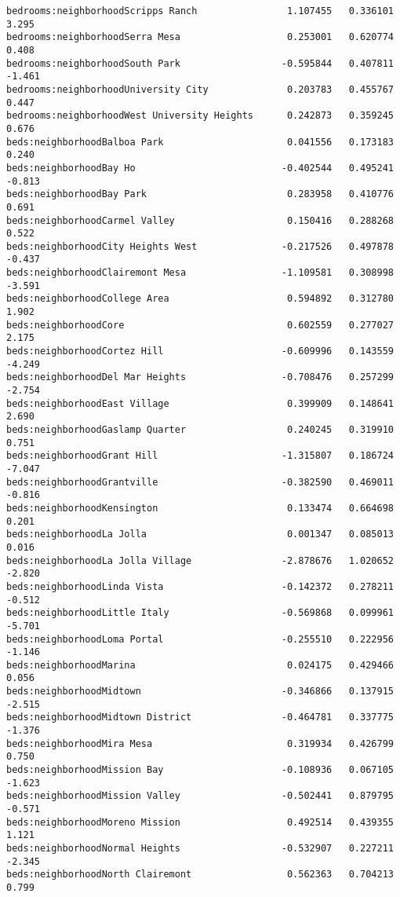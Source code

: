 \documentclass[
  letterpaper,
  krantz2]{style/krantz}
\begin{document}
\begin{verbatim}
bedrooms:neighborhoodScripps Ranch                1.107455   0.336101   3.295
bedrooms:neighborhoodSerra Mesa                   0.253001   0.620774   0.408
bedrooms:neighborhoodSouth Park                  -0.595844   0.407811  -1.461
bedrooms:neighborhoodUniversity City              0.203783   0.455767   0.447
bedrooms:neighborhoodWest University Heights      0.242873   0.359245   0.676
beds:neighborhoodBalboa Park                      0.041556   0.173183   0.240
beds:neighborhoodBay Ho                          -0.402544   0.495241  -0.813
beds:neighborhoodBay Park                         0.283958   0.410776   0.691
beds:neighborhoodCarmel Valley                    0.150416   0.288268   0.522
beds:neighborhoodCity Heights West               -0.217526   0.497878  -0.437
beds:neighborhoodClairemont Mesa                 -1.109581   0.308998  -3.591
beds:neighborhoodCollege Area                     0.594892   0.312780   1.902
beds:neighborhoodCore                             0.602559   0.277027   2.175
beds:neighborhoodCortez Hill                     -0.609996   0.143559  -4.249
beds:neighborhoodDel Mar Heights                 -0.708476   0.257299  -2.754
beds:neighborhoodEast Village                     0.399909   0.148641   2.690
beds:neighborhoodGaslamp Quarter                  0.240245   0.319910   0.751
beds:neighborhoodGrant Hill                      -1.315807   0.186724  -7.047
beds:neighborhoodGrantville                      -0.382590   0.469011  -0.816
beds:neighborhoodKensington                       0.133474   0.664698   0.201
beds:neighborhoodLa Jolla                         0.001347   0.085013   0.016
beds:neighborhoodLa Jolla Village                -2.878676   1.020652  -2.820
beds:neighborhoodLinda Vista                     -0.142372   0.278211  -0.512
beds:neighborhoodLittle Italy                    -0.569868   0.099961  -5.701
beds:neighborhoodLoma Portal                     -0.255510   0.222956  -1.146
beds:neighborhoodMarina                           0.024175   0.429466   0.056
beds:neighborhoodMidtown                         -0.346866   0.137915  -2.515
beds:neighborhoodMidtown District                -0.464781   0.337775  -1.376
beds:neighborhoodMira Mesa                        0.319934   0.426799   0.750
beds:neighborhoodMission Bay                     -0.108936   0.067105  -1.623
beds:neighborhoodMission Valley                  -0.502441   0.879795  -0.571
beds:neighborhoodMoreno Mission                   0.492514   0.439355   1.121
beds:neighborhoodNormal Heights                  -0.532907   0.227211  -2.345
beds:neighborhoodNorth Clairemont                 0.562363   0.704213   0.799

\end{verbatim}
\end{document}
